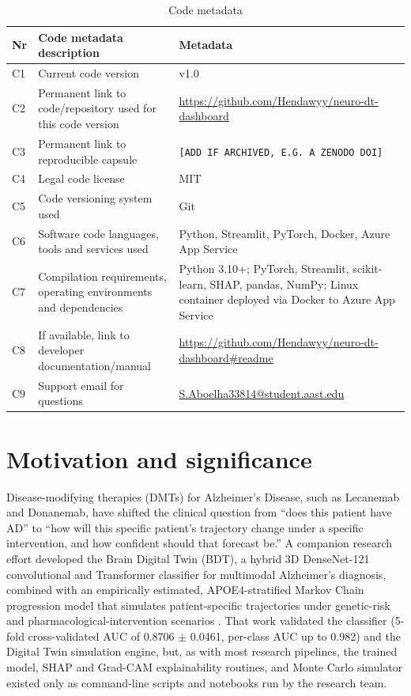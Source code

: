 \documentclass[5p,times,twocolumn]{elsarticle}
\begin{document}
\begin{table}[t]
\centering
\caption{Code metadata}
\label{tab:metadata}
\begin{tabular}{@{}p{}p{}p{}@{}}
\toprule
Nr & Code metadata description & Metadata \\
\midrule
C1 & Current code version & v1.0 \\
C2 & Permanent link to code/repository used for this code version & \url{https://github.com/Hendawyy/neuro-dt-dashboard} \\
C3 & Permanent link to reproducible capsule & \texttt{[ADD IF ARCHIVED, E.G. A ZENODO DOI]} \\
C4 & Legal code license & MIT \\
C5 & Code versioning system used & Git \\
C6 & Software code languages, tools and services used & Python, Streamlit, PyTorch, Docker, Azure App Service \\
C7 & Compilation requirements, operating environments and dependencies & Python 3.10+; PyTorch, Streamlit, scikit-learn, SHAP, pandas, NumPy; Linux container deployed via Docker to Azure App Service \\
C8 & If available, link to developer documentation/manual & \url{https://github.com/Hendawyy/neuro-dt-dashboard#readme} \\
C9 & Support email for questions & \href{mailto:S.Aboelha33814@student.aast.edu}{S.Aboelha33814@student.aast.edu} \\
\bottomrule
\end{tabular}
\end{table}

\section{Motivation and significance}\label{sec1}

Disease-modifying therapies (DMTs) for Alzheimer's Disease, such as Lecanemab \cite{bib_lecanemab} and Donanemab, have shifted the clinical question from ``does this patient have AD'' to ``how will this specific patient's trajectory change under a specific intervention, and how confident should that forecast be.'' A companion research effort developed the Brain Digital Twin (BDT), a hybrid 3D DenseNet-121 convolutional and Transformer classifier for multimodal Alzheimer's diagnosis, combined with an empirically estimated, APOE4-stratified Markov Chain progression model that simulates patient-specific trajectories under genetic-risk and pharmacological-intervention scenarios \cite{bib_bdt}. That work validated the classifier (5-fold cross-validated AUC of 0.8706 $\pm$ 0.0461, per-class AUC up to 0.982) and the Digital Twin simulation engine, but, as with most research pipelines, the trained model, SHAP and Grad-CAM explainability routines, and Monte Carlo simulator existed only as command-line scripts and notebooks run by the research team.
\end{document}
